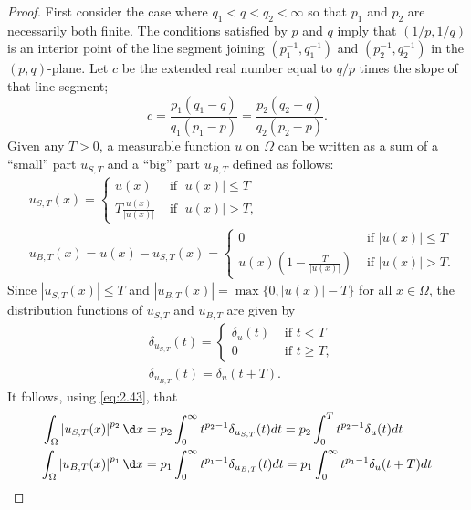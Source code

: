 \begin{proof}
  First consider the case where $q_1<q<q_2<\infty$ so that $p_1$ and $p_2$ are necessarily both finite. 
  The conditions satisfied by $p$ and $q$ imply that $(1 / p, 1 / q)$ is an interior point of the line 
  segment joining $\left(p_1^{-1}, q_1^{-1}\right)$ and $\left(p_2^{-1}, q_2^{-1}\right)$
  in the $(p, q)$-plane. Let $c$ be the extended real number equal to $q / p$ times the slope of
  that line segment;
  \begin{equation}\label{eq:2.44}
    c = \frac{p_1\left(q_1-q\right)}{q_1\left(p_1-p\right)}
     = \frac{p_2\left(q_2-q\right)}{q_2\left(p_2-p\right)}.
  \end{equation}
  Given any $T>0$, a measurable function $u$ on $\Omega$ can be written as a sum of
  a ``small'' part $u_{S, T}$ and a ``big'' part $u_{B, T}$ defined as follows:
  \[
  \begin{aligned}
  & u_{S, T}(x)= \begin{cases}u(x) & \text { if }|u(x)| \leq T \\
  T \frac{u(x)}{|u(x)|} & \text { if }|u(x)|>T,\end{cases} \\
  & u_{B, T}(x)=u(x)-u_{S, T}(x)= \begin{cases}0 & \text { if }|u(x)| \leq T \\
  u(x)\left(1-\frac{T}{|u(x)|}\right) & \text { if }|u(x)|>T .\end{cases}
  \end{aligned}
  \]
  Since $\left|u_{S, T}(x)\right| \leq T$ and $\left|u_{B, T}(x)\right|=\max \{0,|u(x)|-T\}$ for all $x \in \Omega$, the distribution functions of $u_{S, T}$ and $u_{B, T}$ are given by
  \[
  \begin{aligned}
  & \delta_{u_{S, T}}(t)= \begin{cases}\delta_u(t) & \text { if } t<T \\
  0 & \text { if } t \geq T,\end{cases} \\
  & \delta_{u_{B, T}}(t)=\delta_u(t+T) .
  \end{aligned}
  \]
  It follows, using \eqref{eq:2.43}, that
  \[
  \begin{aligned}
  \int_{\Omega}\left|u_{S, T}(x)\right|^{p_2} \d x & =p_2 \int_0^{\infty} t^{p_2-1} \delta_{u_{S, T}}(t) d t=p_2 \int_0^T t^{p_2-1} \delta_u(t) d t \\
  \int_{\Omega}\left|u_{B, T}(x)\right|^{p_1} \d x & =p_1 \int_0^{\infty} t^{p_1-1} \delta_{u_{B, T}}(t) d t=p_1 \int_0^{\infty} t^{p_1-1} \delta_u(t+T) d t \\

\end{aligned}\]
\end{proof}
